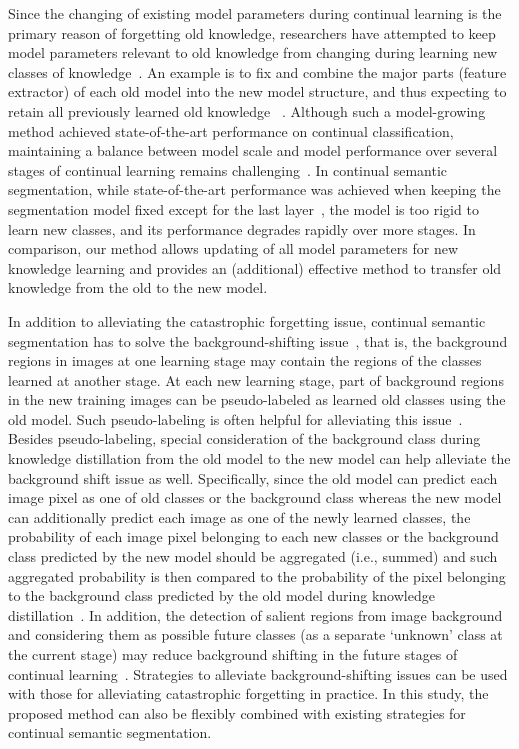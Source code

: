 \documentclass[onecolumn,conference,compsoc]{IEEEtran}
\begin{document}
\begin{spacing}{1.5}
Since the changing of existing model parameters during continual learning is the {primary} reason of forgetting old knowledge, researchers {have attempted} to keep model parameters relevant to old knowledge from changing during learning new classes of knowledge~\cite{EWC,CIL-DMC}. An example is to fix and combine the major {parts} (feature extractor) of each old model into the new model structure, {and thus expecting to retain} all previously learned old knowledge ~\cite{DER}. {Although such a} model-growing method achieved state-of-the-art performance on continual classification, {maintaining} a balance between model scale and model performance over  {several} stages of continual learning  {remains challenging}~\cite{DER_Bayesian}. In continual semantic segmentation, while state-of-the-art performance was achieved when keeping the segmentation model fixed except for the last layer~\cite{SSUL},
the model is too rigid to learn new classes, and its performance  {degrades rapidly} over more stages. In comparison, our method allows updating of all model parameters for new knowledge learning and provides an (additional) effective  {method} to transfer old knowledge from the old to the new model.


In addition to alleviating the catastrophic forgetting issue, continual semantic segmentation has to solve the background-shifting issue~\cite{MiB,PLOP,SSUL},  {that is, the} background regions in images at one learning stage may  {contain the} regions of the classes learned at another stage. {At each new learning stage,  part of background regions in the new training images can be pseudo-labeled as learned old classes using the old model. Such pseudo-labeling {is} often helpful  for alleviating this issue~\cite{PLOP,PLOPLong,SSUL}}. 
{Besides pseudo-labeling, special consideration of the background class during knowledge distillation from the old model to the new model can help alleviate the background shift issue as well. Specifically, since the old model can predict each image pixel as one of old classes or the background class whereas the new model can additionally predict each image as one of the newly learned classes, the probability of each image pixel belonging to each new classes or the background class predicted by the new model should be aggregated (i.e., summed) and such aggregated probability is then compared to the probability of the pixel belonging to the background class predicted by the old model during knowledge distillation~\cite{MiB}}.
{In addition, the detection of} salient regions from image background and considering them as possible future classes (as a separate ‘unknown’ class at the current stage) may reduce background shifting  {in the} future stages of continual learning~\cite{SSUL}. Strategies to alleviate background-shifting issues can be used with those  {for alleviating} catastrophic forgetting in practice. In this study,  {the proposed} method {can also be flexibly combined} with existing strategies for continual semantic segmentation.


\end{spacing}
\end{document}
